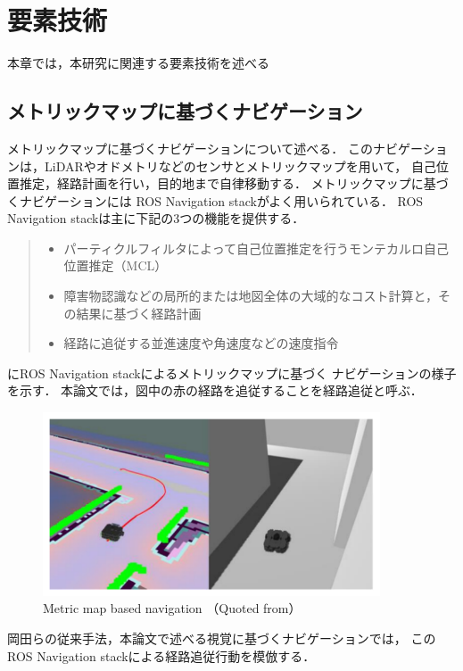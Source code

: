 \chapter{要素技術}
\label{chap:elemental}
本章では，本研究に関連する要素技術を述べる
\section{メトリックマップに基づくナビゲーション}
メトリックマップに基づくナビゲーションについて述べる．
このナビゲーションは，LiDARやオドメトリなどのセンサとメトリックマップを用いて，
自己位置推定，経路計画を行い，目的地まで自律移動する．
メトリックマップに基づくナビゲーションには
ROS Navigation stack\cite{ros}がよく用いられている．
ROS Navigation stackは主に下記の3つの機能を提供する．
\begin{quote}
    \begin{itemize}
     \item パーティクルフィルタによって自己位置推定を行うモンテカルロ自己位置推定（MCL）
     \item 障害物認識などの局所的または地図全体の大域的なコスト計算と，その結果に基づく経路計画
     \item 経路に追従する並進速度や角速度などの速度指令
    \end{itemize}
   \end{quote}
にROS Navigation stackによるメトリックマップに基づく
ナビゲーションの様子を示す．
本論文では，図中の赤の経路を追従することを経路追従と呼ぶ．
\begin{figure}[htbp]
    \centering
     \includegraphics[width=100mm]{images/pdf/nav.pdf}
     \caption{Metric map based navigation （Quoted from\cite{shimada2020}）}
     \label{fig:nav}
\end{figure}
岡田らの従来手法，本論文で述べる視覚に基づくナビゲーションでは，
このROS Navigation stackによる経路追従行動を模倣する．

